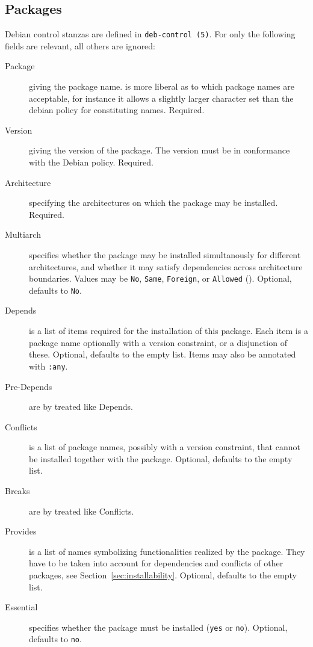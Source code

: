 \subsection{Packages}
\label{sec:packages}
Debian control stanzas are defined in \texttt{deb-control~(5)}. For
\debcheck{} only the following fields are relevant, all others are
ignored:
\begin{description}
\item[Package] giving the package name. \debcheck{} is more liberal as
  to which package names are acceptable, for instance it allows a
  slightly larger character set than the debian policy for
  constituting names. Required.
\item[Version] giving the version of the package. The version must be
  in conformance with the Debian policy. Required.
\item[Architecture] specifying the architectures on which the package
  may be installed. Required.
\item[Multiarch] specifies whether the package may be installed
  simultanously for different architectures, and whether it may
  satisfy dependencies across architecture boundaries. Values may be
  \texttt{No}, \texttt{Same}, \texttt{Foreign}, or \texttt{Allowed}
  (\cite{ubuntu:multiarch}). Optional, defaults to \texttt{No}.
\item[Depends] is a list of items required for the installation of
  this package. Each item is a package name optionally with a version
  constraint, or a disjunction of these. Optional, defaults to the
  empty list. Items may also be annotated with \texttt{:any}.
\item[Pre-Depends] are by \debcheck{} treated like Depends.
\item[Conflicts] is a list of package names, possibly with a version
  constraint, that cannot be installed together with the package. Optional,
  defaults to the empty list.
\item[Breaks] are by \debcheck{} treated like Conflicts.
\item[Provides] is a list of names symbolizing functionalities
  realized by the package. They have to be taken into account for
  dependencies and conflicts of other packages, see
  Section~\ref{sec:installability}. Optional, defaults to the empty
  list.
\item[Essential] specifies whether the package must be installed
  (\texttt{yes} or \texttt{no}). Optional, defaults to \texttt{no}.
\end{description}

